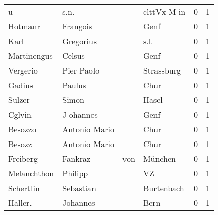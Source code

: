 \documentclass[10pt,a4paper,landscape]{article}
\begin{document}
\begin{longtable}{llllrr}
                        u &                               s.n. &             &                                 clttVx M in &          0 &         1 \\
                  Hotmanr &                           Frangois &             &                                        Genf &          0 &         1 \\
                     Karl &                          Gregorius &             &                                        s.l. &          0 &         1 \\
              Martinengus &                             Celsus &             &                                        Genf &          0 &         1 \\
                 Vergerio &                         Pier Paolo &             &                                  Strassburg &          0 &         1 \\
                   Gadius &                             Paulus &             &                                        Chur &          0 &         1 \\
                   Sulzer &                              Simon &             &                                       Hasel &          0 &         1 \\
                   Cglvin &                          J ohannes &             &                                        Genf &          0 &         1 \\
                  Besozzo &                      Antonio Mario &             &                                        Chur &          0 &         1 \\
                   Besozz &                      Antonio Mario &             &                                        Chur &          0 &         1 \\
                 Freiberg &                            Fankraz &         von &                                     München &          0 &         1 \\
              Melanchthon &                            Philipp &             &                                          VZ &          0 &         1 \\
                Schertlin &                          Sebastian &             &                                  Burtenbach &          0 &         1 \\
                  Haller. &                           Johannes &             &                                        Bern &          0 &         1 \\

\end{longtable}
\end{document}
